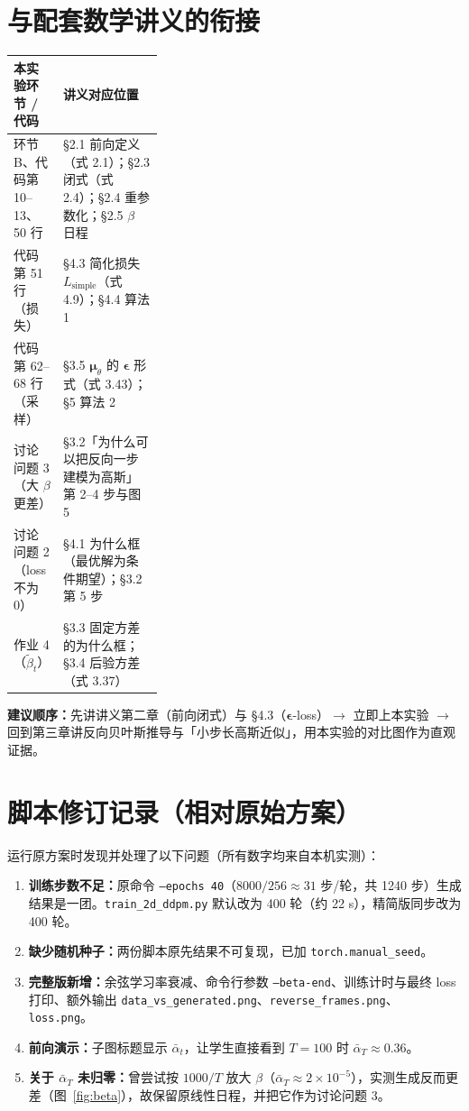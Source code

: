 \documentclass[a4paper,fontset=none,zihao=5]{ctexart}
\newcommand{\abar}{\bar{\alpha}}
\newcommand{\eps}{\boldsymbol{\epsilon}}
\newcommand{\code}[1]{\texttt{#1}}
\begin{document}
\section{与配套数学讲义的衔接}
\begin{center}\small
\renewcommand{\arraystretch}{1.3}
\begin{tabularx}{\linewidth}{@{}>{\raggedright\arraybackslash}p{0.33\linewidth}X@{}}
\toprule
本实验环节 / 代码 & 讲义对应位置 \\
\midrule
环节 B、代码第 10–13、50 行 & §2.1 前向定义（式 2.1）；§2.3 闭式（式 2.4）；§2.4 重参数化；§2.5 $\beta$ 日程 \\
代码第 51 行（损失） & §4.3 简化损失 $L_{\text{simple}}$（式 4.9）；§4.4 算法 1 \\
代码第 62–68 行（采样） & §3.5 $\boldsymbol\mu_\theta$ 的 $\eps$ 形式（式 3.43）；§5 算法 2 \\
讨论问题 3（大 $\beta$ 更差） & §3.2「为什么可以把反向一步建模为高斯」第 2–4 步与图 5 \\
讨论问题 2（loss 不为 0） & §4.1 为什么框（最优解为条件期望）；§3.2 第 5 步 \\
作业 4（$\tilde\beta_t$） & §3.3 固定方差的为什么框；§3.4 后验方差（式 3.37） \\
\bottomrule
\end{tabularx}
\end{center}
\textbf{建议顺序：}先讲讲义第二章（前向闭式）与 §4.3（$\eps$-loss）$\to$ 立即上本实验 $\to$ 回到第三章讲反向贝叶斯推导与「小步长高斯近似」，用本实验的对比图作为直观证据。

\section{脚本修订记录（相对原始方案）}
运行原方案时发现并处理了以下问题（所有数字均来自本机实测）：
\begin{enumerate}[leftmargin=2em,itemsep=2pt]
  \item \textbf{训练步数不足：}原命令 \code{--epochs 40}（$8000/256\approx31$ 步/轮，共 1240 步）生成结果是一团。\code{train\_2d\_ddpm.py} 默认改为 400 轮（约 22 s），精简版同步改为 400 轮。
  \item \textbf{缺少随机种子：}两份脚本原先结果不可复现，已加 \code{torch.manual\_seed}。
  \item \textbf{完整版新增：}余弦学习率衰减、命令行参数 \code{--beta-end}、训练计时与最终 loss 打印、额外输出 \code{data\_vs\_generated.png}、\code{reverse\_frames.png}、\code{loss.png}。
  \item \textbf{前向演示：}子图标题显示 $\abar_t$，让学生直接看到 $T=100$ 时 $\abar_T\approx0.36$。
  \item \textbf{关于 $\abar_T$ 未归零：}曾尝试按 $1000/T$ 放大 $\beta$（$\abar_T\approx2\times10^{-5}$），实测生成反而更差（图~\ref{fig:beta}），故保留原线性日程，并把它作为讨论问题 3。
\end{enumerate}
\end{document}
